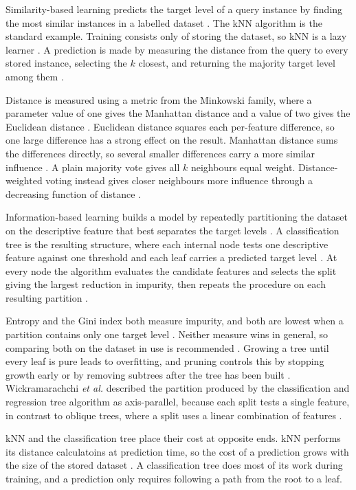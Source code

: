 \documentclass[conference]{IEEEtran}
\begin{document}
Similarity-based learning predicts the target level of a query instance by
finding the most similar instances in a labelled dataset \cite{topic3}. The kNN
algorithm is the standard example. Training consists only of storing the
dataset, so kNN is a lazy learner \cite{kelleher2015}. A prediction is made by
measuring the distance from the query to every stored instance, selecting the
$k$ closest, and returning the majority target level among them
\cite{topic3,kelleher2015}.

Distance is measured using a metric from the Minkowski family, where a
parameter value of one gives the Manhattan distance and a value of two gives
the Euclidean distance \cite{topic3,kelleher2015}. Euclidean distance squares
each per-feature difference, so one large difference has a strong effect on the
result. Manhattan distance sums the differences directly, so several smaller
differences carry a more similar influence \cite{kelleher2015}. A plain
majority vote gives all $k$ neighbours equal weight. Distance-weighted voting
instead gives closer neighbours more influence through a decreasing function of
distance \cite{topic3}.

Information-based learning builds a model by repeatedly partitioning the
dataset on the descriptive feature that best separates the target levels
\cite{topic4}. A classification tree is the resulting structure, where each
internal node tests one descriptive feature against one threshold and each leaf
carries a predicted target level \cite{kelleher2015}. At every node the
algorithm evaluates the candidate features and selects the split giving the
largest reduction in impurity, then repeats the procedure on each resulting
partition \cite{topic4,kelleher2015}.

Entropy and the Gini index both measure impurity, and both are lowest when a
partition contains only one target level \cite{kelleher2015}. Neither measure
wins in general, so comparing both on the dataset in use is recommended
\cite{kelleher2015}. Growing a tree until every leaf is pure leads to
overfitting, and pruning controls this by stopping growth early or by removing
subtrees after the tree has been built \cite{topic4,kelleher2015}.
Wickramarachchi \textit{et al.} described the partition produced by the
classification and regression tree algorithm as axis-parallel, because each
split tests a single feature, in contrast to oblique trees, where a split uses
a linear combination of features \cite{wickramarachchi2016}.

kNN and the classification tree place their cost at opposite ends. kNN performs
its distance calculatoins at prediction time, so the cost of a prediction grows
with the size of the stored dataset \cite{kelleher2015}. A classification tree
does most of its work during training, and a prediction only requires following
a path from the root to a leaf.
\end{document}
